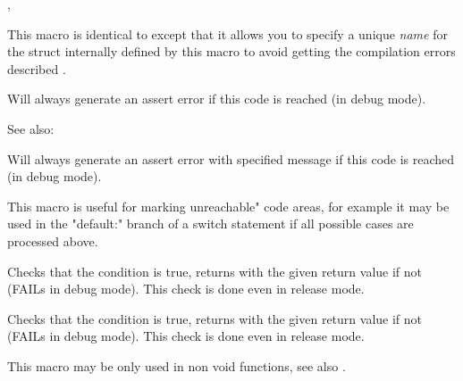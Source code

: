 
,\\


\label{wxcompiletimeassert2}


This macro is identical to 
except that it allows you to specify a unique {\it name} for the struct
internally defined by this macro to avoid getting the compilation errors
described .


\label{wxfail}


Will always generate an assert error if this code is reached (in debug mode).

See also: 


\label{wxfailmsg}


Will always generate an assert error with specified message if this code is reached (in debug mode).

This macro is useful for marking unreachable" code areas, for example
it may be used in the "default:" branch of a switch statement if all possible
cases are processed above.




\label{wxcheck}


Checks that the condition is true, returns with the given return value if not (FAILs in debug mode).
This check is done even in release mode.


\label{wxcheckmsg}


Checks that the condition is true, returns with the given return value if not (FAILs in debug mode).
This check is done even in release mode.

This macro may be only used in non void functions, see also
.


